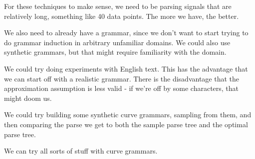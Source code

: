 \documentclass{article}
\begin{document}
For these techniques to make sense, we need to be parsing signals that
are relatively long, something like 40 data points. The more we have,
the better.

We also need to already have a grammar, since we don't want to start
trying to do grammar induction in arbitrary unfamiliar domains. We
could also use synthetic grammars, but that might require familiarity
with the domain.

We could try doing experiments with English text. This has the
advantage that we can start off with a realistic grammar. There is the
disadvantage that the approximation assumption is less valid - if
we're off by some characters, that might doom us.

We could try building some synthetic curve grammars, sampling from
them, and then comparing the parse we get to both the sample parse
tree and the optimal parse tree.

We can try all sorts of stuff with curve grammars.
\end{document}
